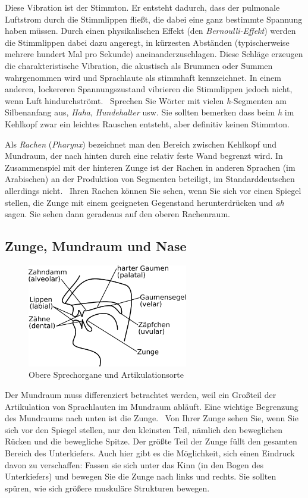Diese Vibration ist der Stimmton.
Er entsteht dadurch, dass der pulmonale Luftstrom durch die Stimmlippen fließt, die dabei eine ganz bestimmte Spannung haben müssen.
Durch einen physikalischen Effekt (den \textit{Bernoulli-Effekt}) werden die Stimmlippen dabei dazu angeregt, in kürzesten Abständen (typischerweise mehrere hundert Mal pro Sekunde) aneinanderzuschlagen.
Diese Schläge erzeugen die charakteristische Vibration, die akustisch als Brummen oder Summen wahrgenommen wird und Sprachlaute als stimmhaft kennzeichnet.
In einem anderen, lockereren Spannungszustand vibrieren die Stimmlippen jedoch nicht, wenn Luft hindurchströmt.
\TuBegin~Sprechen Sie Wörter mit vielen \textit{h}-Segmenten am Silbenanfang aus, \zB \textit{Haha}, \textit{Hundehalter} usw.
Sie sollten bemerken dass beim \textit{h} im Kehlkopf zwar ein leichtes Rauschen entsteht, aber definitiv keinen Stimmton.

Als \textit{Rachen} (\textit{Pharynx}) bezeichnet man den Bereich zwischen Kehlkopf und Mundraum, der nach hinten durch eine relativ feste Wand begrenzt wird.
In Zusammenspiel mit der hinteren Zunge ist der Rachen in anderen Sprachen (\zB im Arabischen) an der Produktion von Segmenten beteiligt, im Standarddeutschen allerdings nicht.
\TuBegin~Ihren Rachen können Sie sehen, wenn Sie sich vor einen Spiegel stellen, die Zunge mit einem geeigneten Gegenstand herunterdrücken und \textit{ah} sagen.
Sie sehen dann geradeaus auf den oberen Rachenraum.

\subsection{Zunge, Mundraum und Nase}

\begin{figure}
  \centering
  \includegraphics[width=7cm]{figures/mundraum}
  \caption[Obere Sprechorgane und Artikulationsorte]{Obere Sprechorgane und Artikulationsorte}
  \label{fig:oberesprechorgane}
\end{figure}

Der Mundraum muss differenziert betrachtet werden, weil ein Großteil der Artikulation von Sprachlauten im Mundraum abläuft.
Eine wichtige Begrenzung des Mundraums nach unten ist die Zunge.
\TuBegin~Von Ihrer Zunge sehen Sie, wenn Sie sich vor den Spiegel stellen, nur den kleinsten Teil, nämlich den beweglichen Rücken und die bewegliche Spitze.
Der größte Teil der Zunge füllt den gesamten Bereich des Unterkiefers.
Auch hier gibt es die Möglichkeit, sich einen Eindruck davon zu verschaffen:
Fassen sie sich unter das Kinn (in den Bogen des Unterkiefers) und bewegen Sie die Zunge nach links und rechts.
Sie sollten spüren, wie sich größere muskuläre Strukturen bewegen.

